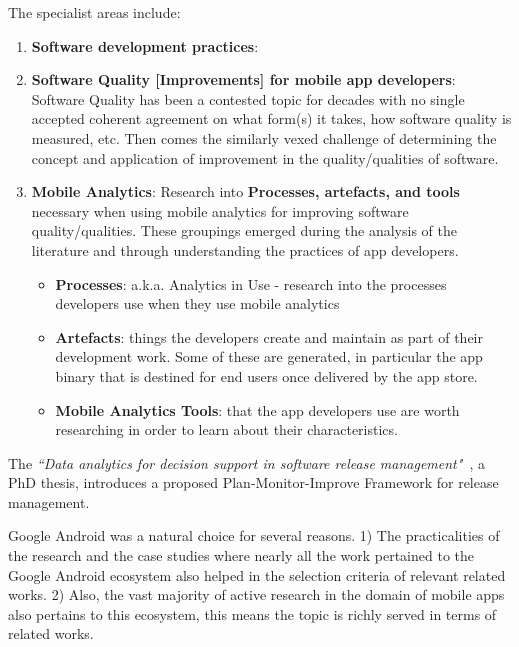 The specialist areas include: 
\begin{enumerate}
    \item \textbf{Software development practices}: 
    \item \textbf{Software Quality [Improvements] for mobile app developers}: Software Quality has been a contested topic for decades with no single accepted coherent agreement on what form(s) it takes, how software quality is measured, etc. Then comes the similarly vexed challenge of determining the concept and application of improvement in the quality/qualities of software. 
    \item \textbf{Mobile Analytics}: Research into \textbf{Processes, artefacts, and tools} necessary when using mobile analytics for improving software quality/qualities. These groupings emerged during the analysis of the literature and through understanding the practices of app developers.
    \begin{itemize}
        \item \textbf{Processes}: a.k.a. Analytics in Use - research into the processes developers use when they use mobile analytics
        \item \textbf{Artefacts}: things the developers create and maintain as part of their development work. Some of these are generated, in particular the app binary that is destined for end users once delivered by the app store.
        \item \textbf{Mobile Analytics Tools}: that the app developers use are worth researching in order to learn about their characteristics.
    \end{itemize}
\end{enumerate}

    
The \emph{``Data analytics for decision support in software release management"}~, a PhD thesis, introduces a proposed Plan-Monitor-Improve Framework for release management.


Google Android was a natural choice for several reasons. 1) The practicalities of the research and the case studies where nearly all the work pertained to the Google Android ecosystem also helped in the selection criteria of relevant related works. 2) Also, the vast majority of active research in the domain of mobile apps also pertains to this ecosystem, this means the topic is richly served in terms of related works.


